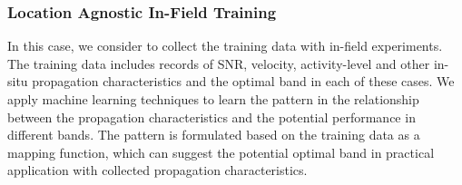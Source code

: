 

\subsubsection{Location Agnostic In-Field Training}
\label{subsubsec:noloca}
In this case, we consider to collect the training data with in-field 
experiments. The training data includes records of SNR, velocity, 
activity-level and other in-situ propagation characteristics and the 
optimal band in each of these cases. We apply machine learning techniques
to learn the pattern in the relationship between the propagation characteristics
and the potential performance in different bands. The pattern
is formulated based on the training data as a mapping function, which
can suggest the potential optimal band in practical application with 
collected propagation characteristics. 


